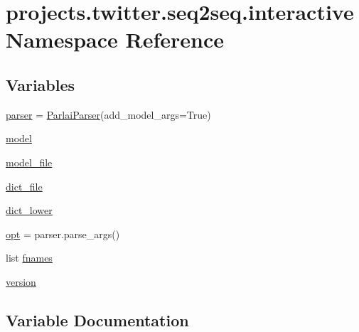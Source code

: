 \hypertarget{namespaceprojects_1_1twitter_1_1seq2seq_1_1interactive}{}\section{projects.\+twitter.\+seq2seq.\+interactive Namespace Reference}
\label{namespaceprojects_1_1twitter_1_1seq2seq_1_1interactive}
\subsection*{Variables}
\begin{DoxyCompactItemize}
\item 
\hyperlink{namespaceprojects_1_1twitter_1_1seq2seq_1_1interactive_acec6c52128a1d95d140ca9cd1e82b16d}{parser} = \hyperlink{classparlai_1_1core_1_1params_1_1ParlaiParser}{Parlai\+Parser}(add\+\_\+model\+\_\+args=True)
\item 
\hyperlink{namespaceprojects_1_1twitter_1_1seq2seq_1_1interactive_abad93075dec6236791fba95c3df1846a}{model}
\item 
\hyperlink{namespaceprojects_1_1twitter_1_1seq2seq_1_1interactive_a4c9deb4c51f585c6b7d3e8d0b752c370}{model\+\_\+file}
\item 
\hyperlink{namespaceprojects_1_1twitter_1_1seq2seq_1_1interactive_a5d2cbf4751399c82269a4297433f25da}{dict\+\_\+file}
\item 
\hyperlink{namespaceprojects_1_1twitter_1_1seq2seq_1_1interactive_a1fff7ce0ab79211a6010326e739474f2}{dict\+\_\+lower}
\item 
\hyperlink{namespaceprojects_1_1twitter_1_1seq2seq_1_1interactive_a7d4ee83d3b3bdf88e548b4c3550e057e}{opt} = parser.\+parse\+\_\+args()
\item 
list \hyperlink{namespaceprojects_1_1twitter_1_1seq2seq_1_1interactive_a6a97f81a9e8578a00585e52a01ec3fa9}{fnames}
\item 
\hyperlink{namespaceprojects_1_1twitter_1_1seq2seq_1_1interactive_a38d3b91fe6745c930dcda52bb7f6fd53}{version}
\end{DoxyCompactItemize}


\subsection{Variable Documentation}
\mbox{\label{namespaceprojects_1_1twitter_1_1seq2seq_1_1interactive_a5d2cbf4751399c82269a4297433f25da}} 
